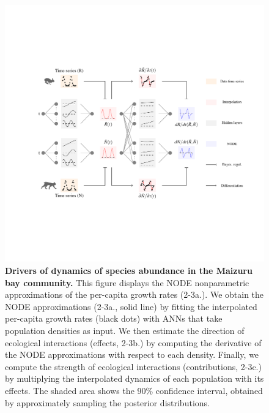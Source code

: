 \documentclass[11pt, oneside]{article}
\begin{document}
\begin{figure}[H]
\includegraphics[width=1\linewidth,page=35]{figures/main.pdf}
\caption{
    \textbf{Drivers of dynamics of species abundance in the Maizuru bay community.}
    This figure displays the NODE nonparametric approximations of the per-capita growth rates (2-3a.). 
    We obtain the NODE approximations (2-3a., solid line) by fitting the interpolated per-capita growth rates (black dots) with ANNs that take population densities as input. 
    We then estimate the direction of ecological interactions (effects, 2-3b.) by computing the derivative of the NODE approximations with respect to each density. 
    Finally, we compute the strength of ecological interactions (contributions, 2-3c.) by multiplying the interpolated dynamics of each population with its effects. 
    The shaded area shows the 90\% confidence interval, obtained by approximately sampling the posterior distributions.
}
\end{figure}
\newpage
\end{document}
